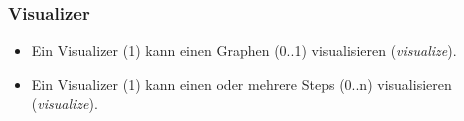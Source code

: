 \subsubsection{Visualizer}
\label{subsubsec:Visualizer}
\begin{itemize}
  \item Ein Visualizer (1) kann einen Graphen (0..1) visualisieren (\textit{visualize}).
  \item Ein Visualizer (1) kann einen oder mehrere Steps (0..n) visualisieren (\textit{visualize}).
\end{itemize}